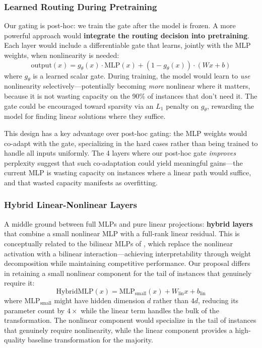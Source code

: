\documentclass[11pt]{article}
\begin{document}
\subsubsection{Learned Routing During Pretraining}

Our gating is post-hoc: we train the gate after the model is frozen. A more powerful approach would \textbf{integrate the routing decision into pretraining}. Each layer would include a differentiable gate that learns, jointly with the MLP weights, when nonlinearity is needed:
\begin{equation}
\mathrm{output}(x) = g_\theta(x) \cdot \mathrm{MLP}(x) + (1 - g_\theta(x)) \cdot (Wx + b)
\end{equation}
where $g_\theta$ is a learned scalar gate. During training, the model would learn to \textit{use} nonlinearity selectively---potentially becoming \textit{more} nonlinear where it matters, because it is not wasting capacity on the 90\% of instances that don't need it. The gate could be encouraged toward sparsity via an $L_1$ penalty on $g_\theta$, rewarding the model for finding linear solutions where they suffice.

This design has a key advantage over post-hoc gating: the MLP weights would co-adapt with the gate, specializing in the hard cases rather than being trained to handle all inputs uniformly. The 4 layers where our post-hoc gate \textit{improves} perplexity suggest that such co-adaptation could yield meaningful gains---the current MLP is wasting capacity on instances where a linear path would suffice, and that wasted capacity manifests as overfitting.

\subsubsection{Hybrid Linear-Nonlinear Layers}

A middle ground between full MLPs and pure linear projections: \textbf{hybrid layers} that combine a small nonlinear MLP with a full-rank linear residual. This is conceptually related to the bilinear MLPs of \citet{dooms2025}, which replace the nonlinear activation with a bilinear interaction---achieving interpretability through weight decomposition while maintaining competitive performance. Our proposal differs in retaining a small nonlinear component for the tail of instances that genuinely require it:
\begin{equation}
\mathrm{HybridMLP}(x) = \mathrm{MLP}_{\mathrm{small}}(x) + W_{\mathrm{lin}} x + b_{\mathrm{lin}}
\end{equation}
where $\mathrm{MLP}_{\mathrm{small}}$ might have hidden dimension $d$ rather than $4d$, reducing its parameter count by $4\times$ while the linear term handles the bulk of the transformation. The nonlinear component would specialize in the tail of instances that genuinely require nonlinearity, while the linear component provides a high-quality baseline transformation for the majority.
\end{document}
